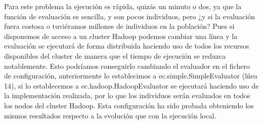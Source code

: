 Para este problema la ejecuci\'on es rápida, quizás un minuto o dos, ya que la función de evaluación es sencilla, y son pocos individuos, pero ¿y si la evaluación fuera costosa o tuviéramos millones de individuos en la población? Pues si disponemos de acceso a un cluster Hadoop podemos cambiar una l\'inea y la evaluación se ejecutar\'a de forma distribuida haciendo uso de todos los recursos disponibles del cluster de manera que el tiempo de ejecución se reduzca notablemente. Esto podríamos conseguirlo cambiando el evaluador en el fichero de configuración, anteriormente lo establecimos a ec.simple.SimpleEvaluator (l\'nea 14), si lo establecemos a ec.hadoop.HadoopEvaluator se ejecutar\'a haciendo uso de la implementación realizada, por lo que los individuos serán evaluados en todos los nodos del cluster Hadoop. Esta configuraci\'on ha sido probada obteniendo los mismos resultados respecto a la evoluci\'on que con la ejecución local.




















